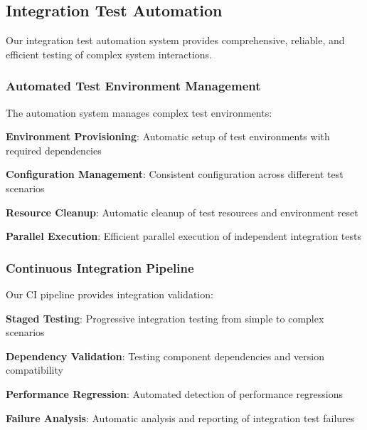 \subsection*{Integration Test Automation}

Our integration test automation system provides comprehensive, reliable, and efficient testing of complex system interactions.

\subsubsection*{Automated Test Environment Management}

The automation system manages complex test environments:

\begin{compactlist}
    \item \textbf{Environment Provisioning}: Automatic setup of test environments with required dependencies
    \item \textbf{Configuration Management}: Consistent configuration across different test scenarios
    \item \textbf{Resource Cleanup}: Automatic cleanup of test resources and environment reset
    \item \textbf{Parallel Execution}: Efficient parallel execution of independent integration tests
\end{compactlist}

\subsubsection*{Continuous Integration Pipeline}

Our CI pipeline provides integration validation:

\begin{compactlist}
    \item \textbf{Staged Testing}: Progressive integration testing from simple to complex scenarios
    \item \textbf{Dependency Validation}: Testing component dependencies and version compatibility
    \item \textbf{Performance Regression}: Automated detection of performance regressions
    \item \textbf{Failure Analysis}: Automatic analysis and reporting of integration test failures
\end{compactlist}

